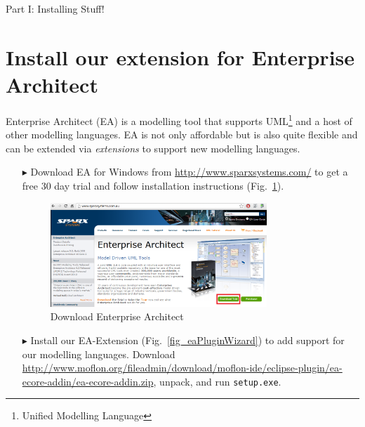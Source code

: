 { \Huge Part I: Installing Stuff! }

\section{Install our extension for Enterprise Architect}
Enterprise Architect (EA) is a modelling tool that supports UML\footnote{Unified Modelling Language} and a host of other modelling languages.
EA is not only affordable but is also quite flexible and can be extended via \emph{extensions} to support new modelling languages.
\begin{enumerate}
  
\item[$\blacktriangleright$] Download EA for Windows from \url{http://www.sparxsystems.com/} to get a free 30 day trial and follow installation instructions (Fig.~\ref{fig_enterpriseArchitextHomepage}).

\begin{figure}[htbp]
	\centering
  	\includegraphics[width=0.77\textwidth]{../installation_images/ea_download.png}
	\caption{Download Enterprise Architect}
	\label{fig_enterpriseArchitextHomepage}
\end{figure} 

\item[$\blacktriangleright$] Install our EA-Extension (Fig.~\ref{fig_eaPluginWizard}) to add support for our modelling languages.
Download \url{http://www.moflon.org/fileadmin/download/moflon-ide/eclipse-plugin/ea-ecore-addin/ea-ecore-addin.zip}, unpack, and run \texttt{setup.exe}.


\end{enumerate}
